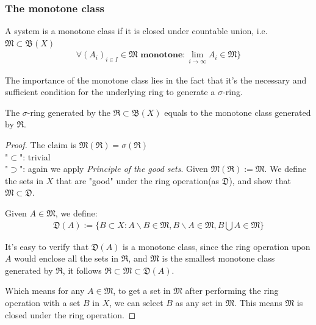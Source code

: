 \subsubsection*{The monotone class}
\begin{definition}
	A system is a monotone class if it is closed under countable union, i.e. $\mathfrak{M} \subset \mathfrak{B}(X)$
	\begin{align*}
		\forall (A_i)_{i \in I} \in \mathfrak{M} \textbf{ monotone}: \lim_{i\rightarrow \infty} A_i \in \mathfrak{M} \}
	\end{align*}
\end{definition}
The importance of the monotone class lies in the fact that it's the necessary and sufficient condition for the underlying ring to generate a $\sigma$-ring.

\begin{theorem}
	The $\sigma$-ring generated by the $\mathfrak{R} \subset \mathfrak{B}(X)$ equals to the monotone class generated by $\mathfrak{R}$.
\end{theorem}
\begin{proof}
	The claim is $\mathfrak{M}(\mathfrak{R}) = \sigma(\mathfrak{R})$\\
	"$\subset$": trivial \\
	"$\supset$": again we apply \textit{Principle of the good sets}. Given $\mathfrak{M}(\mathfrak{R}):= \mathfrak{M}$. We define the sets in $X$ that are "good" under the ring operation(as $\mathfrak{D}$), and show that $\mathfrak{M} \subset \mathfrak{D} $.\par 
	Given $A \in \mathfrak{M}$, we define:
	\begin{align*}
		\mathfrak{D}(A):= \{ B \subset X: A \backslash B \in \mathfrak{M}, B \backslash A \in \mathfrak{M}, B \bigcup A \in \mathfrak{M} \}
	\end{align*}
	
It's easy to verify that $\mathfrak{D}(A)$ is a monotone class, since the ring operation upon $A$ would enclose all the sets in $\mathfrak{R}$, and $\mathfrak{M}$ is the smallest monotone class generated by $\mathfrak{R}$, it follows $\mathfrak{R}  \subset \mathfrak{M} \subset \mathfrak{D}(A)$.\par
Which means for any $A \in \mathfrak{M}$, to get a set in $\mathfrak{M}$ after performing the ring operation with a set $B$ in $X$, we can select $B$ as any set in $\mathfrak{M}$. This means $\mathfrak{M}$ is closed under the ring operation. 
\end{proof}
\begin{remark}
\end{remark}


